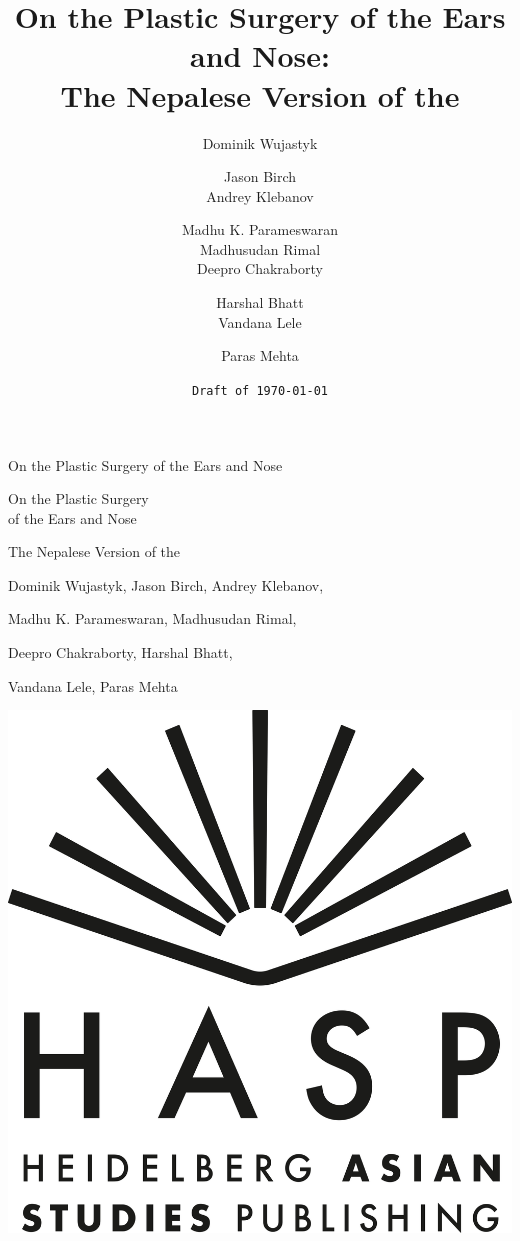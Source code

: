 \documentclass[11pt]{book} %
\title{On the Plastic Surgery of the Ears and Nose:\\ The Nepalese 
    Version of the \SS}
\author{Dominik Wujastyk \and
Jason Birch\\
Andrey Klebanov \and  Madhu K. Parameswaran \\
Madhusudan Rimal \\ Deepro Chakraborty \and
Harshal Bhatt \\ Vandana Lele \and
Paras Mehta}
\date{\texttt{Draft of \today}}
\begin{document}
    

\begin{titlepage}
    \pagestyle{empty}

\begin{center}
\vspace*{.3\textheight}
    \Large
    On the Plastic Surgery of the Ears and Nose
\vspace*{.6\textheight}

\end{center}    

\newpage    

\mbox {} %

\newpage

\begin{center}
    \vspace*{.2\textheight}
    
    {\huge
        On the Plastic Surgery\\ of the Ears and Nose
        
        
        \bigskip
        \Large
        The Nepalese Version of the \SS\par}
    
    \vspace*{.1\textheight}
    
   {\renewcommand\baselinestretch{1.25}\large
    Dominik Wujastyk,
        Jason Birch,
        Andrey Klebanov,
        
        Madhu K. Parameswaran,
        Madhusudan Rimal,
          
        Deepro Chakraborty,  
        Harshal Bhatt,   
        
        Vandana Lele,      
        Paras Mehta
        \par}

\vspace*{\fill}


    \includegraphics[width=.2\textwidth]{media/HASP_Logo_black}

  \medskip
    

\end{center}
\end{titlepage}
\end{document}

